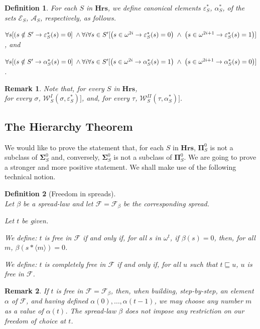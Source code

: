 \documentclass[a4paper]{amsart}
\theoremstyle{plain}
\newtheorem{remark}{Remark}
\newtheorem{definition}{Definition}
\begin{document}
 \begin{definition}\label{D:canonicalelements}For each  $S$ in $\mathbf{Hrs}$, we define  \emph{canonical elements} $\varepsilon^{\ast}_S$, $\alpha^{\ast}_S$,  of  the sets $\mathcal{E}_S$, $\mathcal{A}_S$, respectively, as follows. 
 
 
 
 $\forall s[(s\notin S' \rightarrow \varepsilon^\ast_S(s)=0] \;\wedge\\ \forall i \forall s\in S'[ \bigl(s\in \omega^{2i} \rightarrow \varepsilon^\ast_S(s)=0\bigr)\;\wedge\; \bigl(s\in \omega^{2i+1} \rightarrow \varepsilon^\ast_S(s)=1\bigr)]$, and
 
 $\forall s[(s\notin S' \rightarrow \alpha^\ast_S(s)=0] \;\wedge\\ \forall i \forall s\in S'[ \bigl(s\in \omega^{2i} \rightarrow \alpha^\ast_S(s)=1\bigr)\;\wedge\; \bigl(s\in \omega^{2i+1} \rightarrow \alpha^\ast_S(s)=0\bigr)]$.\end{definition}
 
 \begin{remark} Note that, for every $S$ in $\mathbf{Hrs}$, \\for every $\sigma$, $\mathcal{W}^I_S(\sigma, \varepsilon^\ast_S)]$, and, for every $\tau$, $\mathcal{W}^{II}_S(\tau, \alpha_S^\ast)]$. \end{remark}
 
 \subsection{The Hierarchy Theorem}
 
 We would like to prove the statement that, for each $S$ in $\mathbf{Hrs}$, $\mathbf{\Pi}^0_S$ is not a subclass of $\mathbf{\Sigma}^0_S$ and, conversely,  $\mathbf{\Sigma}^0_S$ is not a subclass of $\mathbf{\Pi}^0_S$. We are going to prove a stronger and more positive  statement. We shall make use of the following technical notion.
\begin{definition}[Freedom in spreads]\label{D:value-dictating} $\;$ \\ Let $\beta$ be a spread-law and let $\mathcal{F}=\mathcal{F}_\beta$ be the corresponding spread. 

Let $t$ be given. 

We define: $t$ is \emph{free in $\mathcal{F}$} if and only if, for all $s$ in $\omega^t$, if $\beta(s)=0$, then, for all $m$, $\beta(s\ast\langle m \rangle)=0$.  

We  define: $t$ is \emph{completely free in $\mathcal{F}$} if and only if, for all $u$ such that $t\sqsubseteq u$, $u$ is free in $\mathcal{F}$.


 \end{definition}
\begin{remark} If $t$ is free in $\mathcal{F}=\mathcal{F}_\beta$, then, when building, step-by-step, an element $\alpha$ of $\mathcal{F}$, and having defined $\alpha(0), \ldots, \alpha(t-1)$, we may choose any number $m$ as a value of $\alpha(t)$. The spread-law $\beta$ does not impose any restriction on our freedom of choice at $t$.\end{remark}
\end{document}
